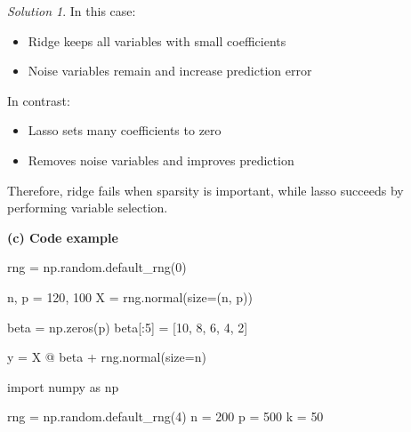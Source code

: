 \documentclass[
  english,
]{article}
\newenvironment{Shaded}{\begin{snugshade}}{\end{snugshade}}
\newcommand{\DecValTok}[1]{\textcolor[rgb]{0.68,0.00,0.00}{#1}}
\newcommand{\ImportTok}[1]{\textcolor[rgb]{0.00,0.46,0.62}{#1}}
\newcommand{\NormalTok}[1]{\textcolor[rgb]{0.00,0.23,0.31}{#1}}
\newcommand{\OperatorTok}[1]{\textcolor[rgb]{0.37,0.37,0.37}{#1}}
\providecommand{\tightlist}{%
  \setlength{\itemsep}{0pt}\setlength{\parskip}{0pt}}
\theoremstyle{definition}
\theoremstyle{definition}
\theoremstyle{remark}
\newtheorem*{solution}{Solution}
\begin{document}
\begin{solution}
In this case:

\begin{itemize}
\tightlist
\item
  Ridge keeps all variables with small coefficients
\item
  Noise variables remain and increase prediction error
\end{itemize}

In contrast:

\begin{itemize}
\tightlist
\item
  Lasso sets many coefficients to zero
\item
  Removes noise variables and improves prediction
\end{itemize}

Therefore, ridge fails when sparsity is important, while lasso succeeds
by performing variable selection.

\textbf{(c) Code example}

\begin{Shaded}
\begin{Highlighting}[]
\NormalTok{rng }\OperatorTok{=}\NormalTok{ np.random.default\_rng(}\DecValTok{0}\NormalTok{)}

\NormalTok{n, p }\OperatorTok{=} \DecValTok{120}\NormalTok{, }\DecValTok{100}
\NormalTok{X }\OperatorTok{=}\NormalTok{ rng.normal(size}\OperatorTok{=}\NormalTok{(n, p))}

\NormalTok{beta }\OperatorTok{=}\NormalTok{ np.zeros(p)}
\NormalTok{beta[:}\DecValTok{5}\NormalTok{] }\OperatorTok{=}\NormalTok{ [}\DecValTok{10}\NormalTok{, }\DecValTok{8}\NormalTok{, }\DecValTok{6}\NormalTok{, }\DecValTok{4}\NormalTok{, }\DecValTok{2}\NormalTok{]}

\NormalTok{y }\OperatorTok{=}\NormalTok{ X }\OperatorTok{@}\NormalTok{ beta }\OperatorTok{+}\NormalTok{ rng.normal(size}\OperatorTok{=}\NormalTok{n)}
\end{Highlighting}
\end{Shaded}

\begin{Shaded}
\begin{Highlighting}[]
\ImportTok{import}\NormalTok{ numpy }\ImportTok{as}\NormalTok{ np}

\NormalTok{rng }\OperatorTok{=}\NormalTok{ np.random.default\_rng(}\DecValTok{4}\NormalTok{)}
\NormalTok{n }\OperatorTok{=} \DecValTok{200}
\NormalTok{p }\OperatorTok{=} \DecValTok{500}  
\NormalTok{k }\OperatorTok{=} \DecValTok{50}  


\end{Highlighting}
\end{Shaded}
\end{solution}
\end{document}
